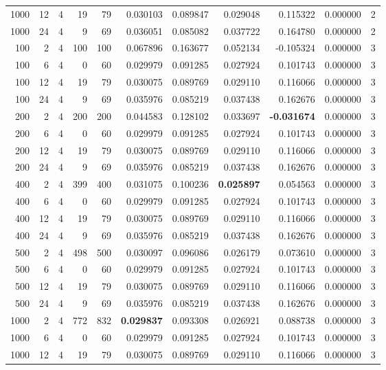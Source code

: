 \begin{table}
\begin{tabular}{rrrrrrrrrrr}
1000 & 12 & 4 & 19 & 79 & 0.030103 & 0.089847 & 0.029048 & 0.115322 & 0.000000 & 2 \\
1000 & 24 & 4 & 9 & 69 & 0.036051 & 0.085082 & 0.037722 & 0.164780 & 0.000000 & 2 \\
100 & 2 & 4 & 100 & 100 & 0.067896 & 0.163677 & 0.052134 & -0.105324 & 0.000000 & 3 \\
100 & 6 & 4 & 0 & 60 & 0.029979 & 0.091285 & 0.027924 & 0.101743 & 0.000000 & 3 \\
100 & 12 & 4 & 19 & 79 & 0.030075 & 0.089769 & 0.029110 & 0.116066 & 0.000000 & 3 \\
100 & 24 & 4 & 9 & 69 & 0.035976 & 0.085219 & 0.037438 & 0.162676 & 0.000000 & 3 \\
200 & 2 & 4 & 200 & 200 & 0.044583 & 0.128102 & 0.033697 & \textbf{-0.031674} & 0.000000 & 3 \\
200 & 6 & 4 & 0 & 60 & 0.029979 & 0.091285 & 0.027924 & 0.101743 & 0.000000 & 3 \\
200 & 12 & 4 & 19 & 79 & 0.030075 & 0.089769 & 0.029110 & 0.116066 & 0.000000 & 3 \\
200 & 24 & 4 & 9 & 69 & 0.035976 & 0.085219 & 0.037438 & 0.162676 & 0.000000 & 3 \\
400 & 2 & 4 & 399 & 400 & 0.031075 & 0.100236 & \textbf{0.025897} & 0.054563 & 0.000000 & 3 \\
400 & 6 & 4 & 0 & 60 & 0.029979 & 0.091285 & 0.027924 & 0.101743 & 0.000000 & 3 \\
400 & 12 & 4 & 19 & 79 & 0.030075 & 0.089769 & 0.029110 & 0.116066 & 0.000000 & 3 \\
400 & 24 & 4 & 9 & 69 & 0.035976 & 0.085219 & 0.037438 & 0.162676 & 0.000000 & 3 \\
500 & 2 & 4 & 498 & 500 & 0.030097 & 0.096086 & 0.026179 & 0.073610 & 0.000000 & 3 \\
500 & 6 & 4 & 0 & 60 & 0.029979 & 0.091285 & 0.027924 & 0.101743 & 0.000000 & 3 \\
500 & 12 & 4 & 19 & 79 & 0.030075 & 0.089769 & 0.029110 & 0.116066 & 0.000000 & 3 \\
500 & 24 & 4 & 9 & 69 & 0.035976 & 0.085219 & 0.037438 & 0.162676 & 0.000000 & 3 \\
1000 & 2 & 4 & 772 & 832 & \textbf{0.029837} & 0.093308 & 0.026921 & 0.088738 & 0.000000 & 3 \\
1000 & 6 & 4 & 0 & 60 & 0.029979 & 0.091285 & 0.027924 & 0.101743 & 0.000000 & 3 \\
1000 & 12 & 4 & 19 & 79 & 0.030075 & 0.089769 & 0.029110 & 0.116066 & 0.000000 & 3 \\

\end{tabular}
\end{table}

